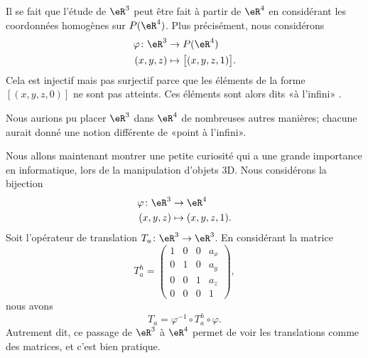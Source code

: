 Il se fait que l'étude de \( \eR^3\) peut être fait à partir de \( \eR^4\) en considérant les coordonnées homogènes sur \( P(\eR^4)\). Plus précisément, nous considérons
\begin{equation}
	\begin{aligned}
		\varphi\colon \eR^3 & \to P(\eR^4)                   \\
		(x,y,z)             & \mapsto \big[ (x,y,z,1) \big].
	\end{aligned}
\end{equation}
Cela est injectif mais pas surjectif parce que les éléments de la forme \( [(x,y,z,0)]\) ne sont pas atteints. Ces éléments sont alors dits «à l'infini» .

Nous aurions pu placer \( \eR^3\) dans \( \eR^4\) de nombreuses autres manières; chacune aurait donné une notion différente de «point à l'infini».

Nous allons maintenant montrer une petite curiosité qui a une grande importance en informatique, lors de la manipulation d'objets 3D. Nous considérons la bijection
\begin{equation}
	\begin{aligned}
		\varphi\colon \eR^3 & \to \eR^4          \\
		(x,y,z)             & \mapsto (x,y,z,1).
	\end{aligned}
\end{equation}
Soit l'opérateur de translation \( T_a\colon \eR^3\to \eR^3\). En considérant la matrice
\begin{equation}
	T^h_a=\begin{pmatrix}
		1 & 0 & 0 & a_x \\
		0 & 1 & 0 & a_y \\
		0 & 0 & 1 & a_z \\
		0 & 0 & 0 & 1
	\end{pmatrix},
\end{equation}
nous avons
\begin{equation}
	T_a=\varphi^{-1}\circ T_a^h\circ \varphi.
\end{equation}
Autrement dit, ce passage de \( \eR^3\) à \( \eR^4\) permet de voir les translations comme des matrices, et c'est bien pratique.


